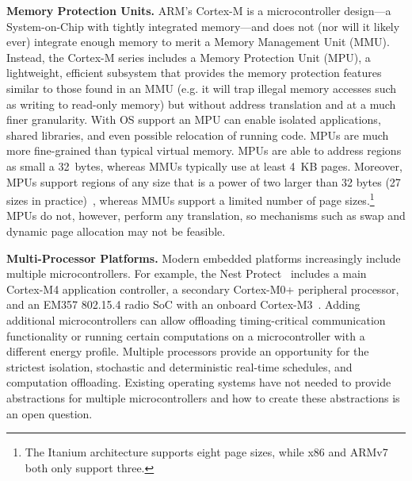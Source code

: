 {\bf Memory Protection Units.}
ARM's Cortex-M is a microcontroller design---a System-on-Chip with tightly
integrated memory---and does not (nor will it likely ever) integrate enough
memory to merit a Memory Management Unit (MMU). Instead, the Cortex-M series
includes a Memory Protection Unit (MPU), a lightweight, efficient subsystem
that provides the memory protection features similar to those found in an MMU
(e.g. it will trap illegal memory accesses such as writing to read-only memory)
but without address translation and at a much finer granularity.
With OS support an MPU can enable isolated applications, shared libraries, and
even possible relocation of running code.
MPUs are much more fine-grained than typical virtual memory. MPUs are able to
address regions as small a 32~bytes, whereas MMUs typically use at least 4~KB
pages. Moreover, MPUs support regions of any size that is a power of two larger
than 32 bytes (27 sizes in practice)~\cite{cortexm4-ug:ch4.5}, whereas MMUs
support a limited number of page sizes.\footnote{The Itanium architecture
supports eight page sizes, while x86 and ARMv7 both only support three.}
MPUs do not, however, perform any translation, so mechanisms such as swap and
dynamic page allocation may not be feasible.

{\bf Multi-Processor Platforms.}
Modern embedded platforms increasingly include multiple microcontrollers. For
example, the Nest Protect~\cite{nest-protect} includes a main Cortex-M4 application controller, a
secondary Cortex-M0+ peripheral processor, and an EM357 802.15.4 radio SoC with
an onboard Cortex-M3~\cite{nestprotect-teardown}. Adding additional
microcontrollers can allow offloading timing-critical communication
functionality or running certain computations on a microcontroller with a
different energy profile. Multiple processors provide an opportunity for the
strictest isolation, stochastic and deterministic real-time schedules, and
computation offloading.
Existing operating systems have not needed to provide abstractions for multiple
microcontrollers and how to create these abstractions is an open question.



